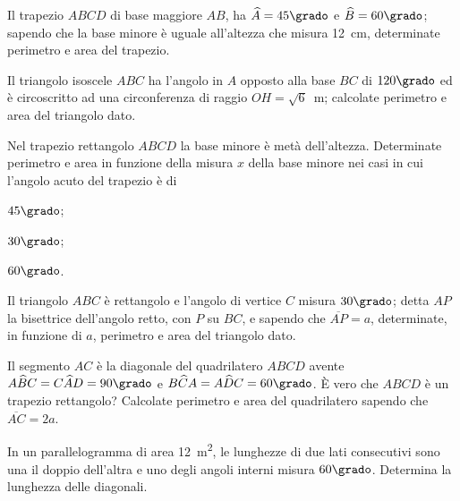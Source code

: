 \begin{multicols}{2}
\begin{esercizio}
\label{ese:7.28}
Il trapezio $ABCD$ di base maggiore $AB$, ha $\widehat{A}=45\grado$ e 
$\widehat{B}=60\grado$; sapendo che la base minore è uguale 
all'altezza che misura 12~cm, determinate perimetro e area del 
trapezio.
\end{esercizio}

\begin{esercizio}
\label{ese:7.30}
Il triangolo isoscele $ABC$ ha l'angolo in $A$ opposto alla base $BC$ 
di $120\grado$ ed è circoscritto ad una circonferenza di raggio 
$OH=\sqrt{6}$~m; calcolate perimetro e area del triangolo dato.
\end{esercizio}

\begin{esercizio}
\label{ese:7.32}
Nel trapezio rettangolo $ABCD$ la base minore è metà dell'altezza. 
Determinate perimetro e area in funzione della misura $x$ della base 
minore nei casi in cui l'angolo acuto del trapezio è di
\begin{enumeratea}
\item $45\grado$;
\item $30\grado$;
\item $60\grado$.
\end{enumeratea}
\end{esercizio}

\begin{esercizio}
\label{ese:7.33}
Il triangolo $ABC$ è rettangolo e l'angolo di vertice $C$ misura 
$30\grado$; detta $AP$ la bisettrice dell'angolo retto, con $P$ su 
$BC$, e sapendo che $\overline{AP}=a$, determinate, in funzione di 
$a$, perimetro e area del triangolo dato.
\end{esercizio}

\begin{esercizio}
\label{ese:7.34}
Il segmento $AC$ è la diagonale del quadrilatero $ABCD$ avente 
$A\widehat{B}C=C\widehat{A}D=90\grado$ e 
$B\widehat{C}A=A\widehat{D}C=60\grado$. \`E vero che $ABCD$ è un 
trapezio rettangolo? Calcolate perimetro e area del quadrilatero 
sapendo che $\overline{AC}=2a$.
\end{esercizio}

\begin{esercizio}
\label{ese:7.36}
In un parallelogramma di area 12~m\textsuperscript{2}, le lunghezze 
di due lati consecutivi sono una il doppio dell'altra e uno degli 
angoli interni misura $60\grado$. Determina la lunghezza delle 
diagonali.
\end{esercizio}


\end{multicols}
